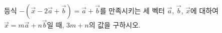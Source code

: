 등식 $-(\vec{x}-2\vec{a}+\vec{b})=\vec{a}+\vec{b}$를 만족시키는 세 벡터 $\vec{a}$, $\vec{b}$, $\vec{x}$에 대하여 $\vec{x}=m\vec{a}+n\vec{b}$일 때, $3m+n$의 값을 구하시오. 
